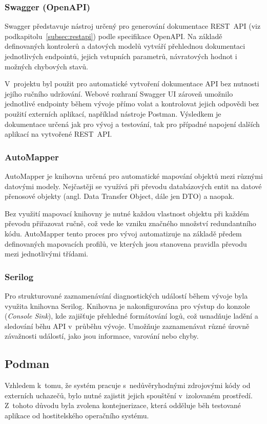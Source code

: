 \documentclass[
  biblatex,
  figures,
  tables,
  glossaries,
  index
]{kidiplom}
\begin{document}
\subsubsection{Swagger (OpenAPI)}
\label{subsec:swagger}
Swagger představuje nástroj určený pro generování dokumentace REST~API (viz podkapitolu~\ref{subsec:restapi}) podle specifikace OpenAPI. Na základě definovaných kontrolerů a datových modelů vytváří přehlednou dokumentaci jednotlivých endpointů, jejich vstupních parametrů, návratových hodnot i možných chybových stavů. 

V~projektu byl použit pro automatické vytvoření dokumentace API bez nutnosti jejího ručního udržování. Webové rozhraní Swagger UI zároveň umožnilo jednotlivé endpointy během vývoje přímo volat a kontrolovat jejich odpovědi bez použití externích aplikací, například nástroje Postman. Výsledkem je dokumentace určená jak pro vývoj a testování, tak pro případné napojení dalších aplikací na vytvořené REST~API.~\cite{swagger} 


\subsubsection{AutoMapper}
AutoMapper je knihovna určená pro automatické mapování objektů mezi různými datovými modely. Nejčastěji se využívá při převodu databázových entit na datové přenosové objekty (angl. Data Transfer Object, dále jen DTO) a naopak.

Bez využití mapovací knihovny je nutné každou vlastnost objektu při každém převodu přiřazovat ručně, což vede ke vzniku značného množství redundantního kódu. AutoMapper tento proces pro vývoj automatizuje na základě předem definovaných mapovacích profilů, ve kterých jsou stanovena pravidla převodu mezi jednotlivými třídami.~\cite{automapper}


\subsubsection{Serilog}
Pro strukturované zaznamenávání diagnostických událostí během vývoje byla využita knihovna Serilog. Knihovna je nakonfigurována pro výstup do konzole (\textit{Console Sink}), kde zajišťuje přehledné formátování logů, což usnadňuje ladění a sledování běhu API v~průběhu vývoje. Umožňuje zaznamenávat různé úrovně závažnosti událostí, jako jsou informace, varování nebo chyby.~\cite{serilog}


\subsection{Podman}
Vzhledem k~tomu, že systém pracuje s~nedůvěryhodnými zdrojovými kódy od externích uchazečů, bylo nutné zajistit jejich spouštění v~izolovaném prostředí. Z~tohoto důvodu byla zvolena kontejnerizace, která odděluje běh testované aplikace od hostitelského operačního systému.
\end{document}

